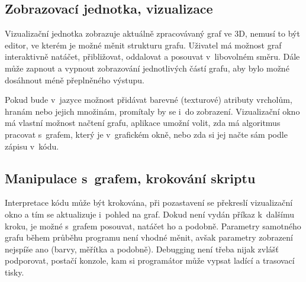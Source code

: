 \documentclass[11pt,twoside,a4paper]{book}
\begin{document}
\subsection{Zobrazovací jednotka, vizualizace}

Vizualizační jednotka zobrazuje aktuálně zpracovávaný graf ve 3D, nemusí to být editor, ve kterém je možné měnit strukturu grafu. Uživatel má možnost graf interaktivně natáčet, přibližovat, oddalovat a posouvat v~libovolném směru. Dále může zapnout a vypnout zobrazování jednotlivých částí grafu, aby bylo možné dosáhnout méně přeplněného výstupu.

Pokud bude v~jazyce možnost přidávat barevné (texturové) atributy vrcholům, hranám nebo jejich množinám, promítaly by se i~do zobrazení. Vizualizační okno má vlastní možnost načtení grafu, aplikace umožní volit, zda má algoritmus pracovat s~grafem, který je v~grafickém okně, nebo zda si jej načte sám podle zápisu v~kódu.


\subsection{Manipulace s~grafem, krokování skriptu}

Interpretace kódu může být krokována, při pozastavení se překreslí vizualizační okno a tím se aktualizuje i~pohled na graf. Dokud není vydán příkaz k~dalšímu kroku, je možné s~grafem posouvat, natáčet ho a podobně. Parametry samotného grafu během průběhu programu není vhodné měnit, avšak parametry zobrazení nejspíše ano (barvy, měřítka a podobně). Debugging není třeba nijak zvlášť podporovat, postačí konzole, kam si programátor může vypsat ladící a trasovací tisky.


%
%
\end{document}
